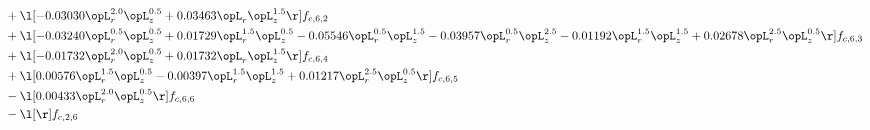 \begin{alignat}{2}
& + \l[  -0.03030 \opL_r^{2.0} \opL_z^{0.5} +  0.03463 \opL_r \opL_z^{1.5}  \r] f_{c,6,2} \nonumber \\ 
& + \l[  -0.03240 \opL_r^{0.5} \opL_z^{0.5} +  0.01729 \opL_r^{1.5} \opL_z^{0.5}   -0.05546 \opL_r^{0.5} \opL_z^{1.5}   -0.03957 \opL_r^{0.5} \opL_z^{2.5}   -0.01192 \opL_r^{1.5} \opL_z^{1.5} +  0.02678 \opL_r^{2.5} \opL_z^{0.5}  \r] f_{c,6,3} \nonumber \\ 
& + \l[  -0.01732 \opL_r^{2.0} \opL_z^{0.5} +  0.01732 \opL_r \opL_z^{1.5}  \r] f_{c,6,4} \nonumber \\ 
& + \l[  0.00576 \opL_r^{1.5} \opL_z^{0.5}   -0.00397 \opL_r^{1.5} \opL_z^{1.5} +  0.01217 \opL_r^{2.5} \opL_z^{0.5}  \r] f_{c,6,5} \nonumber \\ 
& - \l[  0.00433 \opL_r^{2.0} \opL_z^{0.5}  \r] f_{c,6,6} \nonumber \\ 
& - \l[  \r] f_{c,2,6} \nonumber \\ 
\end{alignat} 


